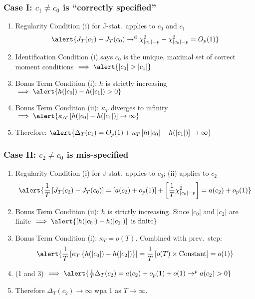 \begin{frame}
  \frametitle{Case I: $c_1 \neq c_0$ is ``correctly specified''}

  \small

\begin{enumerate}
  \item Regularity Condition (i) for J-stat.\ applies to $c_0$ and $c_1$
  \[
    \alert{J_T(c_1) - J_T(c_0) \rightarrow^{\text{d}} \chi^2_{|c_1|-p} - \chi^2_{|c_0| - p} = O_p(1)}
  \]
\item Identification Condition (i) says $c_0$ is the unique, maximal set of correct moment conditions $\implies \alert{|c_0|>|c_1|}$
\item Bonus Term Condition (i): $h$ is strictly increasing $\implies \alert{h(|c_0|) - h(|c_1|) > 0}$
\item Bonus Term Condition (ii): $\kappa_T$ diverges to infinity $\implies \alert{\kappa,_T\left[ h(|c_0| - h(|c_1|) \right] \rightarrow \infty}$
\item Therefore: $\alert{\Delta_T(c_1) = O_p(1) + \kappa_T\left[ h(|c_0| - h(|c_1|) \right] \rightarrow \infty}$ \checkmark 
\end{enumerate}
\end{frame}
\begin{frame}
  \frametitle{Case II: $c_2 \neq c_0$ is mis-specified}
  \small
  \begin{enumerate}
    \item Regularity Condition (i) for J-stat.\ applies to $c_0$; (ii) applies to $c_2$
      \[
        \alert{\frac{1}{T} \left[J_T(c_2) - J_T(c_0)\right] = [a(c_2) + o_p(1)] + \left[\frac{1}{T} \chi^2_{|c_0|-p}\right] = a(c_2) + o_p(1)}
      \]
    \item Bonus Term Condition (ii): $h$ is strictly increasing. Since $|c_0|$ and $|c_2|$ are finite $\implies \alert{\left[h(|c_0|)-h(|c_1|)\right] \text{ is finite}}$ 
    \item Bonus Term Condition (i): $\kappa_T = o(T)$. Combined with prev.\ step:
      \[
        \alert{\frac{1}{T}\left[ \kappa_T\left\{ h(|c_0|) - h(|c_2|) \right\} \right] = \frac{1}{T}\left[ o(T) \times \text{Constant} \right] = o(1)}
      \]
    \item (1 and 3) $ \implies \alert{\frac{1}{T} \Delta_T(c_2) = a(c_2) + o_p(1) + o(1) \rightarrow^p a(c_2) > 0}$
    \item Therefore $\Delta_T(c_2) \rightarrow \infty$ wpa 1 as $T\rightarrow \infty$.
  \end{enumerate}
\end{frame}

